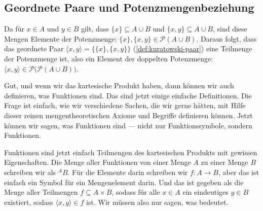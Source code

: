 \subsection{Geordnete Paare und Potenzmengenbeziehung}
\begin{math-stroke}

\begin{explanation-of-steps}
Da für $x \in A$ und $y \in B$ gilt, dass $\{x\} \subseteq A \cup B$ und $\{x, y\} \subseteq A \cup B$, sind diese Mengen Elemente der Potenzmenge: $\{x\}, \{x, y\} \in \mathcal{P}(A \cup B)$. 
Daraus folgt, dass das geordnete Paar $\langle x, y \rangle = \{\{x\}, \{x, y\}\}$ (\cref{def:kuratowski-paar}) eine Teilmenge der Potenzmenge ist, also ein Element der doppelten Potenzmenge: $\langle x, y \rangle \in \mathcal{P}\bigl(\mathcal{P}(A \cup B)\bigr)$.
\end{explanation-of-steps}
\end{math-stroke}

\begin{spoken-clean}[00:57:37 - 00:59:51]
Gut, und wenn wir das kartesische Produkt haben, dann können wir auch definieren, was Funktionen sind. Das sind jetzt einige einfache Definitionen. Die Frage ist einfach, wie wir verschiedene Sachen, die wir gerne hätten, mit Hilfe dieser reinen mengentheoretischen Axiome und Begriffe definieren können. Jetzt können wir sagen, was Funktionen sind --- nicht nur Funktionssymbole, sondern Funktionen.

Funktionen sind jetzt einfach Teilmengen des kartesischen Produkts mit gewissen Eigenschaften. Die Menge aller Funktionen von einer Menge $A$ zu einer Menge $B$ schreiben wir als ${}^A B$. Für die Elemente darin schreiben wir $f \colon A \to B$, aber das ist einfach ein Symbol für ein Mengenelement darin. Und das ist gegeben als die Menge aller Teilmengen $f \subseteq A \times B$, sodass für alle $x \in A$ ein eindeutiges $y \in B$ existiert, sodass $\langle x, y \rangle \in f$ ist. Wir müssen also nur sagen, was  bedeutet.
\end{spoken-clean}

